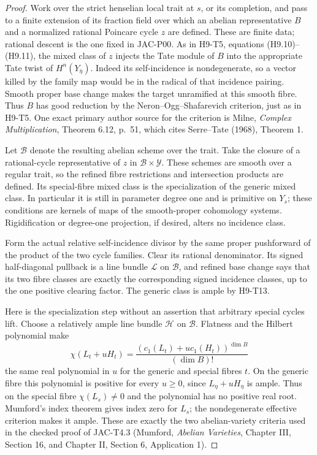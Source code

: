 \begin{proof}
Work over the strict henselian local trait at $s$, or its completion,
and pass to a finite extension of its fraction field over which an
abelian representative $B$ and a normalized rational Poincare cycle
$z$ are defined. These are finite data; rational descent is the one
fixed in JAC-P00. As in H9-T5, equations (H9.10)--(H9.11), the
mixed class of $z$ injects the Tate module of $B$ into the appropriate
Tate twist of $H^n(Y_{\bar\eta})$. Indeed its self-incidence is
nondegenerate, so a vector killed by the family map would be in
the radical of that incidence pairing. Smooth proper base change
makes the target unramified at this smooth fibre. Thus $B$ has
good reduction by the Neron--Ogg--Shafarevich criterion, just as in
H9-T5. One exact primary author source for the criterion is Milne,
\emph{Complex Multiplication}, Theorem 6.12, p.~51, which cites
Serre--Tate (1968), Theorem 1.

Let $\mathscr B$ denote the resulting abelian scheme over the trait.
Take the closure of a rational-cycle representative of $z$ in
$\mathscr B\times\mathscr Y$. These schemes are smooth over a
regular trait, so the refined fibre restrictions and intersection
products are defined. Its special-fibre mixed class is the
specialization of the generic mixed class. In particular it is
still in parameter degree one and is primitive on $Y_s$; these
conditions are kernels of maps of the smooth-proper cohomology
systems. Rigidification or degree-one projection, if desired,
alters no incidence class.

Form the actual relative self-incidence divisor by the same proper
pushforward of the product of the two cycle families. Clear its
rational denominator. Its signed half-diagonal pullback is a line
bundle $\mathscr L$ on $\mathscr B$, and refined base change says
that its two fibre classes are exactly the corresponding signed
incidence classes, up to the one positive clearing factor. The
generic class is ample by H9-T13.

Here is the specialization step without an assertion that arbitrary
special cycles lift. Choose a relatively ample line bundle
$\mathscr H$ on $\mathscr B$. Flatness and the Hilbert polynomial
make
\[
 \chi(L_t+uH_t)=\frac{(c_1(L_t)+u c_1(H_t))^{\dim B}}{(\dim B)!}
\]
the same real polynomial in $u$ for the generic and special fibres
$t$. On the generic fibre this polynomial is positive for every
$u\geq0$, since $L_{\eta}+uH_{\eta}$ is ample. Thus on the
special fibre $\chi(L_s)\ne0$ and the polynomial has no positive
real root. Mumford's index theorem gives index zero for $L_s$;
the nondegenerate effective criterion makes it ample. These are
exactly the two abelian-variety criteria used in the checked proof
of JAC-T4.3 (Mumford, \emph{Abelian Varieties}, Chapter III,
Section 16, and Chapter II, Section 6, Application 1).


\end{proof}
